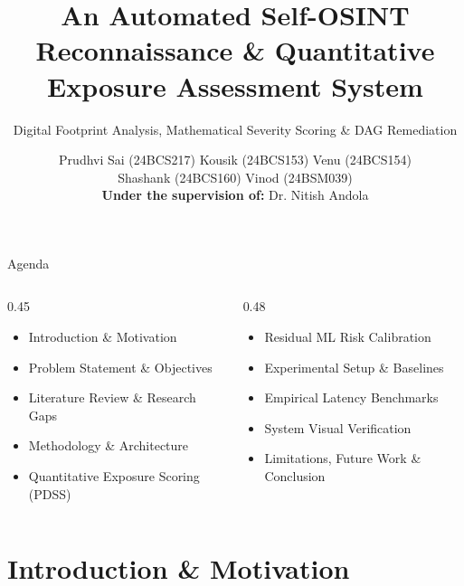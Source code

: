 \documentclass[aspectratio=169,10pt]{beamer}
\title[DigiZafe: Automated OSINT \& Risk Platform]{An Automated Self-OSINT Reconnaissance \& Quantitative Exposure Assessment System}
\subtitle{Digital Footprint Analysis, Mathematical Severity Scoring \& DAG Remediation}
\author[Prudhvi Sai et al.]{Prudhvi Sai (24BCS217) \quad Kousik (24BCS153) \quad Venu (24BCS154)\\ Shashank (24BCS160) \quad Vinod (24BSM039)\\ \vspace{0.3em} \scriptsize{\textbf{Under the supervision of:} Dr. Nitish Andola}}
\institute[PDPM IIITDM Jabalpur]{Department of Computer Science and Engineering\\ PDPM IIITDM Jabalpur}
\date{} %
\begin{document}
\begin{frame}
  \titlepage
\end{frame}

\begin{frame}{Agenda}
  \large
  \vspace{0.2cm}
  \begin{columns}[T]
    \begin{column}{0.45\textwidth}
      \begin{itemize}\setlength{\itemsep}{0.25cm}
        \item Introduction \& Motivation
        \item Problem Statement \& Objectives
        \item Literature Review \& Research Gaps
        \item Methodology \& Architecture
        \item Quantitative Exposure Scoring (PDSS)
      \end{itemize}
    \end{column}
    \begin{column}{0.48\textwidth}
      \begin{itemize}\setlength{\itemsep}{0.25cm}
        \item Residual ML Risk Calibration
        \item Experimental Setup \& Baselines
        \item Empirical Latency Benchmarks
        \item System Visual Verification
        \item Limitations, Future Work \& Conclusion
      \end{itemize}
    \end{column}
  \end{columns}
\end{frame}

\section{Introduction \& Motivation}
\end{document}
